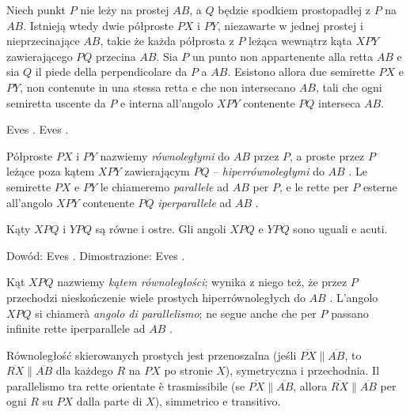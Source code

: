 \begin{axiom}
[Łobaczewskiego] %
[di Lobachevskij] %
	Niech punkt $P$ nie leży na prostej $AB$, a $Q$ będzie spodkiem prostopadłej z $P$ na $AB$. %
	Istnieją wtedy dwie półproste $PX$ i $PY$, niezawarte w jednej prostej i nieprzecinające $AB$, takie że każda półprosta z $P$ leżąca wewnątrz kąta $XPY$ zawierającego $PQ$ przecina $AB$. %
	Sia $P$ un punto non appartenente alla retta $AB$ e sia $Q$ il piede della perpendicolare da $P$ a $AB$. %
	Esistono allora due semirette $PX$ e $PY$, non contenute in una stessa retta e che non intersecano $AB$, tali che ogni semiretta uscente da $P$ e interna all'angolo $XPY$ contenente $PQ$ interseca $AB$. %
\end{axiom}

Eves \cite[s. 291]{eves1_1972}. %
Eves \cite[p. 291]{eves1_1972}. %

Półproste $PX$ i $PY$ nazwiemy \emph{równoległymi} do $AB$ przez $P$, a proste przez $P$ leżące poza kątem $XPY$ zawierającym $PQ$ -- \emph{hiperrównoległymi} do $AB$ \cite[s. 291--292]{eves1_1972}. %
Le semirette $PX$ e $PY$ le chiameremo \emph{parallele} ad $AB$ per $P$, e le rette per $P$ esterne all'angolo $XPY$ contenente $PQ$ \emph{iperparallele} ad $AB$ \cite[p. 291--292]{eves1_1972}. %

\begin{theorem}
	Kąty $XPQ$ i $YPQ$ są równe i ostre. %
	Gli angoli $XPQ$ e $YPQ$ sono uguali e acuti. %
\end{theorem}

Dowód: Eves \cite[s. 292]{eves1_1972}. %
Dimostrazione: Eves \cite[p. 292]{eves1_1972}. %

Kąt $XPQ$ nazwiemy \emph{kątem równoległości}; wynika z niego też, że przez $P$ przechodzi nieskończenie wiele prostych hiperrównoległych do $AB$ \cite[s. 292]{eves1_1972}. %
L'angolo $XPQ$ si chiamerà \emph{angolo di parallelismo}; ne segue anche che per $P$ passano infinite rette iperparallele ad $AB$ \cite[p. 292]{eves1_1972}. %

\begin{proposition}
	Równoległość skierowanych prostych jest przenoszalna (jeśli $\overline{PX} \parallel \overline{AB}$, to $\overline{RX} \parallel \overline{AB}$ dla każdego $R$ na $PX$ po stronie $X$), symetryczna i przechodnia. %
	Il parallelismo tra rette orientate è trasmissibile (se $\overline{PX} \parallel \overline{AB}$, allora $\overline{RX} \parallel \overline{AB}$ per ogni $R$ su $PX$ dalla parte di $X$), simmetrico e transitivo. %
\end{proposition}

